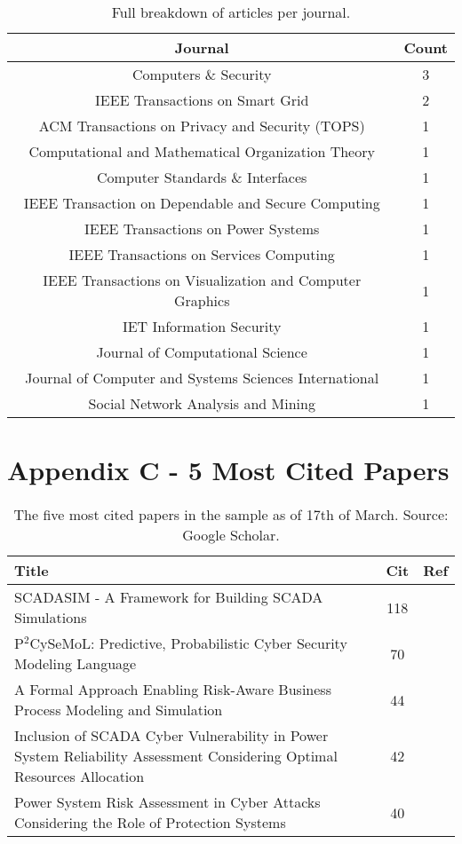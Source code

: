 \documentclass{article}
\begin{document}
\begin{center}
\begin{table}[h!]
\begin{tabular}{ | c | c |}
\hline
Journal & Count \\
\hline
Computers \& Security & 3 \\
\hline
IEEE Transactions on Smart Grid & 2\\
\hline
ACM Transactions on Privacy and Security (TOPS) & 1 \\
\hline
Computational and Mathematical Organization Theory & 1 \\
\hline
Computer Standards \& Interfaces & 1 \\
\hline
IEEE Transaction on Dependable and Secure Computing & 1\\
\hline
IEEE Transactions on Power Systems & 1\\
\hline
IEEE Transactions on Services Computing & 1\\
\hline
IEEE Transactions on Visualization and Computer Graphics & 1\\
\hline
IET Information Security & 1\\
\hline
Journal of Computational Science & 1\\
\hline
Journal of Computer and Systems Sciences International & 1\\
\hline
Social Network Analysis and Mining & 1\\
\hline
\end{tabular}
\caption{\label{table:JournalBreakdown} Full breakdown of articles per journal.}
\end{table}
\end{center}

\newpage
\section{Appendix C - 5 Most Cited Papers}

\begin{center}
\begin{table}[h]
\begin{tabular}{ | m{25em} | c | c |}
\hline
Title & Cit & Ref \\
\hline
SCADASIM - A Framework for Building SCADA Simulations  & 118 & \cite{queiroz2011}\\
\hline
P$^2$CySeMoL: Predictive, Probabilistic Cyber Security Modeling Language & 70 & \cite{holm2014}\\
\hline
A Formal Approach Enabling Risk-Aware Business Process Modeling and Simulation & 44 & \cite{tjoa2010}\\
\hline
Inclusion of SCADA Cyber Vulnerability in Power System Reliability Assessment Considering Optimal Resources Allocation & 42 & \cite{zhang2016} \\
\hline
Power System Risk Assessment in Cyber Attacks Considering the Role of Protection Systems & 40 & \cite{liu2016}\\
\hline
\end{tabular}
\caption{\label{table:TopRefs}The five most cited papers in the sample as of 17th of March. Source: Google Scholar.}
\end{table}
\end{center}
\end{document}
